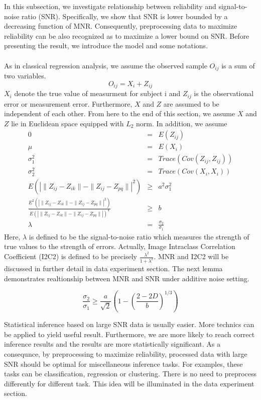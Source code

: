 \documentclass{article}
\begin{document}
In this subsection, we investigate relationship between reliability and signal-to-noise ratio (SNR). Specifically, we show that SNR is lower bounded by a decreasing function of MNR. Consequently, preprocessing data to maximize reliability can be also recognized as to maximize a lower bound on SNR. Before presenting the result, we introduce the model and some notations. \\
\\
As in classical regression analysis, we assume the observed sample $O_{ij}$ is a sum of two variables.
\[O_{ij}=X_i+Z_{ij}\]
$X_i$ denote the true value of measurment for subject i and $Z_{ij}$ is the observational error or measurement error. Furthermore, $X$ and $Z$ are assumed to be independent of each other. From here to the end of this section, we assume $X$ and $Z$ lie in Euclidean space equipped with $L_2$ norm. In addition, we assume 
\begin{eqnarray*}
0&=& E(Z_{ij}) \\
\mu &=&E(X_i)\\
\sigma_1^2&=&Trace(Cov(Z_{ij},Z_{ij})) \\
\sigma_2^2&=&Trace(Cov(X_{i},X_{i}))\\
E(|\|Z_{ij}-Z_{ik}\|-\|Z_{ij}-Z_{pq}\||^2) &\geq& a^2 \sigma_1^2 \\
\frac{E^2(|\|Z_{ij}-Z_{ik}\|-\|Z_{ij}-Z_{pq}\||^2)}{E(|\|Z_{ij}-Z_{ik}\|-\|Z_{ij}-Z_{pq}\||)^4} &\geq& b \\
\lambda&=&\frac{\sigma_2}{\sigma_1} 
\end{eqnarray*}
Here, $\lambda$ is defined to be the signal-to-noise ratio which measures the strength of true values to the strength of errors. Actually, Image Intraclass Correlation Coefficient (I2C2) is defined to be precisely $\frac{\lambda^2}{1+\lambda^2}$. MNR and I2C2 will be discussed in further detail in data experiment section. The next lemma demonstrates realtionship between MNR and SNR under additive noise setting.

\begin{lem} 
\[\frac{ \sigma_2}{\sigma_1} \geq\frac{a}{\sqrt{2}} (1-(\frac{2-2D}{b})^{1/3} )\]
\end{lem}
\noindent Statistical inference based on large SNR data is usually easier. More technics can be applied to yield useful result. Furthermore, we are more likely to reach correct inference results and the results are more statistically significant. As a consequnce, by preprocessing to maximize reliability, processed data with large SNR should be optimal for miscellaneous inference tasks. For examples, these tasks can be classification, regression or clustering. There is no need to preprocess differently for different task. This idea will be illuminated in the data experiment section.
\end{document}
